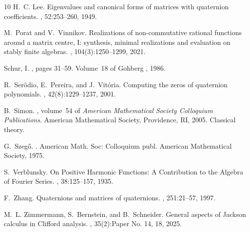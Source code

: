 \documentclass[11pt,reqno]{amsart}
\theoremstyle{definition}
\numberwithin{equation}{section}
\begin{document}
\begin{thebibliography}{10}
H.~C. Lee.
\newblock Eigenvalues and canonical forms of matrices with quaternion
  coefficients.
, 52:253--260, 1949.

M.~Porat and V.~Vinnikov.
\newblock Realizations of non-commutative rational functions around a matrix
  centre, {I}: synthesis, minimal realizations and evaluation on stably finite
  algebras.
, 104(3):1250--1299, 2021.

{Schur, I.}
, pages 31--59.
\newblock Volume~18 of Gohberg \cite{Goh86}, 1986.

R.~Serôdio, E.~Pereira, and J.~Vitória.
\newblock Computing the zeros of quaternion polynomials.
, 42(8):1229--1237,
  2001.

B.~Simon.
, volume~54 of {\em American Mathematical Society Colloquium
  Publications}.
\newblock American Mathematical Society, Providence, RI, 2005.
\newblock Classical theory.

G.~Szeg{\H{o}}.
.
\newblock American Math. Soc: Colloquium publ. American Mathematical Society,
  1975.

S.~Verblunsky.
\newblock On {P}ositive {H}armonic {F}unctions: {A} {C}ontribution to the
  {A}lgebra of {F}ourier {S}eries.
, 38:125--157, 1935.

F.~Zhang.
\newblock Quaternions and matrices of quaternions.
, 251:21--57, 1997.

M.~L. Zimmermann, S.~Bernstein, and B.~Schneider.
\newblock General aspects of {J}ackson calculus in {C}lifford analysis.
, 35(2):Paper No. 14, 18, 2025.

\end{thebibliography}
\end{document}
